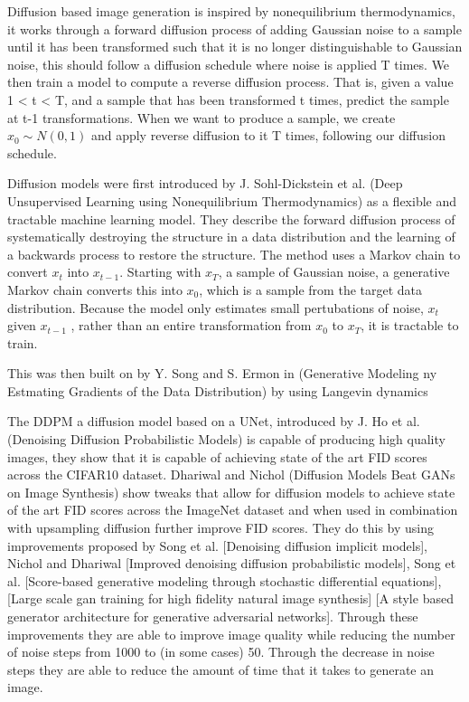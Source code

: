 \documentclass{UoYCSproject}
\begin{document}
Diffusion based image generation is inspired by nonequilibrium thermodynamics, it works through a forward diffusion process of adding Gaussian noise to a sample until it has been transformed such that it is no longer distinguishable to Gaussian noise, this should follow a diffusion schedule where noise is applied T times. We then train a model to compute a reverse diffusion process. That is, given a value 1 < t < T, and a sample that has been transformed t times, predict the sample at t-1 transformations. When we want to produce a sample, we create $ x_0 \sim N(0,1) $ and apply reverse diffusion to it T times, following our diffusion schedule. 

Diffusion models were first introduced by J. Sohl-Dickstein et al. (Deep Unsupervised Learning using Nonequilibrium Thermodynamics) as a flexible and tractable machine learning model. They describe the forward diffusion process of systematically destroying the structure in a data distribution and the learning of a backwards process to restore the structure. The method uses a Markov chain to convert $ x_t $ into $ x_{t-1} $. Starting with $ x_T $, a sample of Gaussian noise, a generative Markov chain converts this into $ x_0 $, which is a sample from the target data distribution. Because the model only estimates small pertubations of noise, $ x_t $ given $ x_{t-1} $ , rather than an entire transformation from $ x_0 $ to $ x_T $, it is tractable to train. 

This was then built on by Y. Song and S. Ermon in (Generative Modeling ny Estmating Gradients of the Data Distribution) by using Langevin dynamics 

The DDPM a diffusion model based on a UNet, introduced by J. Ho et al. (Denoising Diffusion Probabilistic Models) is capable of producing high quality images, they show that it is capable of achieving state of the art FID scores across the CIFAR10 dataset. Dhariwal and Nichol (Diffusion Models Beat GANs on Image Synthesis) show tweaks that allow for diffusion models to achieve state of the art FID scores across the ImageNet dataset and when used in combination with upsampling diffusion further improve FID scores. They do this by using improvements proposed by Song et al. [Denoising diffusion implicit models], Nichol and Dhariwal [Improved denoising diffusion probabilistic models], Song et al. [Score-based generative modeling through stochastic differential equations], [Large scale gan training for high fidelity natural image synthesis] [A style based generator architecture for generative adversarial networks]. Through these improvements they are able to improve image quality while reducing the number of noise steps from 1000 to (in some cases) 50. Through the decrease in noise steps they are able to reduce the amount of time that it takes to generate an image.  
\end{document}

